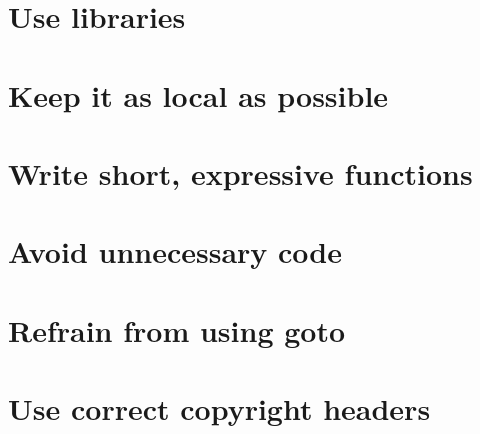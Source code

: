 \documentclass[a4paper,11pt]{scrreprt}
\begin{document}
\section{Use libraries}
\section{Keep it as local as possible}
\section{Write short, expressive functions}
\section{Avoid unnecessary code}
\section{Refrain from using goto}
\section{Use correct copyright headers}
\end{document}
